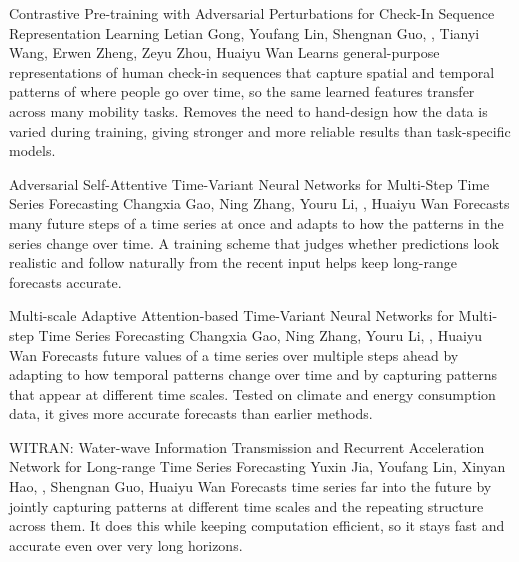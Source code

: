 {Contrastive Pre-training with Adversarial Perturbations for Check-In Sequence Representation Learning}
{Letian Gong, Youfang Lin, Shengnan Guo, \me, Tianyi Wang, Erwen Zheng, Zeyu Zhou, Huaiyu Wan}
{Learns general-purpose representations of human check-in sequences that capture spatial and temporal patterns of where people go over time, so the same learned features transfer across many mobility tasks. Removes the need to hand-design how the data is varied during training, giving stronger and more reliable results than task-specific models.}

{Adversarial Self-Attentive Time-Variant Neural Networks for Multi-Step Time Series Forecasting}
{Changxia Gao, Ning Zhang, Youru Li, \me, Huaiyu Wan}
{Forecasts many future steps of a time series at once and adapts to how the patterns in the series change over time. A training scheme that judges whether predictions look realistic and follow naturally from the recent input helps keep long-range forecasts accurate.}

{Multi-scale Adaptive Attention-based Time-Variant Neural Networks for Multi-step Time Series Forecasting}
{Changxia Gao, Ning Zhang, Youru Li, \me, Huaiyu Wan}
{Forecasts future values of a time series over multiple steps ahead by adapting to how temporal patterns change over time and by capturing patterns that appear at different time scales. Tested on climate and energy consumption data, it gives more accurate forecasts than earlier methods.}

{WITRAN: Water-wave Information Transmission and Recurrent Acceleration Network for Long-range Time Series Forecasting}
{Yuxin Jia, Youfang Lin, Xinyan Hao, \me, Shengnan Guo, Huaiyu Wan}
{Forecasts time series far into the future by jointly capturing patterns at different time scales and the repeating structure across them. It does this while keeping computation efficient, so it stays fast and accurate even over very long horizons.}
